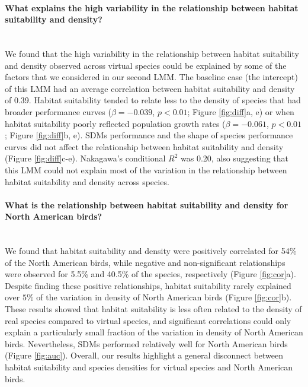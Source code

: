 \paragraph*{What explains the high variability in the relationship between habitat suitability and density?}\mbox{}\\
We found that the high variability in the relationship between habitat suitability and density observed across virtual species could be explained by some of the factors that we considered in our second LMM. The baseline case (the intercept) of this LMM had an average correlation between habitat suitability and density of 0.39. Habitat suitability tended to relate less to the density of species that had broader performance curves ($\beta = -0.039$, $p < 0.01$; Figure \ref{fig:diff}a, e) or when habitat suitability poorly reflected population growth rates ($\beta = -0.061$, $p < 0.01$; Figure \ref{fig:diff}b, e). SDMs performance and the shape of species performance curves did not affect the relationship between habitat suitability and density (Figure \ref{fig:diff}c-e). Nakagawa's conditional $R^2$ was 0.20, also suggesting that this LMM could not explain most of the variation in the relationship between habitat suitability and density across species. 


\paragraph*{What is the relationship between habitat suitability and density for North American birds?}\mbox{}\\
We found that habitat suitability and density were positively correlated for 54\% of the North American birds, while negative and non-significant relationships were observed for 5.5\% and 40.5\% of the species, respectively (Figure \ref{fig:cor}a). Despite finding these positive relationships, habitat suitability rarely explained over $5\%$ of the variation in density of North American birds (Figure \ref{fig:cor}b). These results showed that habitat suitability is less often related to the density of real species compared to virtual species, and significant correlations could only explain a particularly small fraction of the variation in density of North American birds. Nevertheless, SDMs performed relatively well for North American birds (Figure \ref{fig:auc}). Overall, our results highlight a general disconnect between habitat suitability and species densities for virtual species and North American birds.








